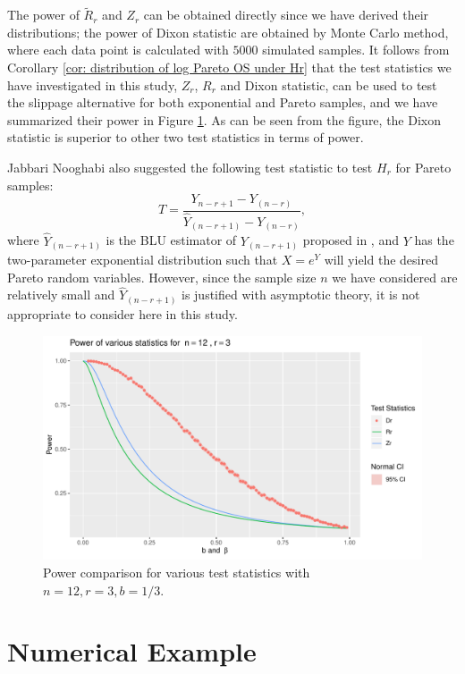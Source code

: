 \documentclass{report}
\begin{document}
The power of $\tilde R_r$ and $Z_r$ can be obtained directly since we have 
derived their distributions; the power of Dixon statistic are obtained by Monte Carlo method, where each data point is calculated
with $5000$ simulated samples. It follows from Corollary \ref{cor: distribution of log Pareto OS under Hr} that the test
statistics we have investigated in this study, $Z_r$, $R_r$ and Dixon statistic, can be used to test the slippage alternative
for both exponential and Pareto samples, and we have summarized their power in Figure \ref{Figure: powers}. As
can be seen from the figure, the Dixon statistic is superior to other two test statistics in terms of power.

Jabbari Nooghabi also suggested the following test statistic \cite{jabbari2019detecting} to test $H_r$ for Pareto samples:
\[ 
    T = \frac{Y_{n-r+1} - Y_{(n-r)}}{\hat Y_{(n-r+1)} - Y_{(n-r)}},
\]
where $\hat Y_{(n-r+1)}$ is the BLU estimator of $Y_{(n-r+1)}$ proposed in \cite{kaminsky1975best}, and $Y$ has the two-parameter
exponential distribution such that $X = e^Y$ will yield the desired Pareto random variables. However, since the sample size $n$ we have
considered are relatively small and $\hat Y_{(n-r+1)}$ is justified with asymptotic theory, it is not appropriate to consider here in this study.

\begin{figure}[htbp]
    {\centering
    \includegraphics[scale = 0.55]{plot_5.pdf}
    \caption{\label{Figure: powers}Power comparison for various test statistics with $n =12, r =3, b = 1/3$.}}
\end{figure}
\section{Numerical Example}
\end{document}

